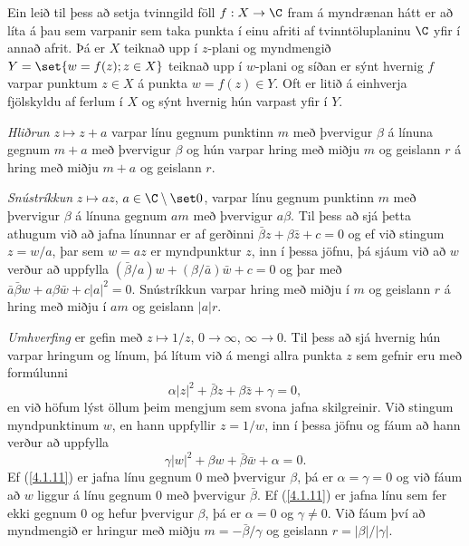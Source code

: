 Ein  leið til þess að setja tvinngild föll
$f:X\to \C$ fram á myndrænan hátt
er að líta á þau sem varpanir sem taka punkta í einu afriti af
tvinntöluplaninu $\C$ yfir í annað afrit.  Þá er $X$ teiknað upp í
$z$-plani og myndmengið $Y=\set{w=f(z); z\in X}$ 
teiknað upp í $w$-plani og síðan er sýnt
hvernig $f$ varpar punktum $z\in X$ á punkta $w=f(z)\in Y$.
Oft er litið á einhverja fjölskyldu af ferlum í $X$ og sýnt hvernig hún
varpast yfir í $Y$. 




\smallskip\noindent
{\it Hliðrun}  $z\mapsto z+a$ varpar línu gegnum punktinn $m$ með
þvervigur ${\beta}$  á línuna gegnum $m+a$ með þvervigur ${\beta}$ og
hún varpar hring með miðju $m$ og geislann $r$ á hring með miðju $m+a$
og geislann $r$.





\smallskip\noindent
{\it Snústríkkun}
$z\mapsto az$, $a\in \C\setminus \set 0$, varpar línu gegnum
punktinn $m$ með þvervigur ${\beta}$  á línuna gegnum $am$ með
þvervigur $a{\beta}$. Til þess að sjá þetta athugum við að jafna
línunnar er af gerðinni $\bar {\beta} z+{\beta}\bar z+c=0$ og ef við
stingum $z=w/a$, þar sem $w=az$ er myndpunktur $z$, inn í þessa
jöfnu, þá sjáum við að $w$ verður að uppfylla
$(\bar {\beta}/a) w+({\beta}/\bar a)\bar w+c=0$ og þar með
$\bar a\bar {\beta} w+a{\beta}\bar w+c|a|^2=0$.  
Snústríkkun varpar hring með miðju í $m$ og geislann $r$ á hring með
miðju í $am$ og geislann $|a|r$.




\smallskip\noindent
{\it Umhverfing} er gefin
með $z\mapsto 1/z$, $0\to {\infty}$, ${\infty}\to 0$.  Til þess að
sjá hvernig hún varpar hringum og línum, þá lítum við á mengi allra
punkta $z$ sem gefnir eru með formúlunni
\begin{equation}
{\alpha}|z|^2+\bar {\beta} z+{\beta}\bar z +{\gamma}=0,
\label{4.1.11}
\end{equation}
en við höfum lýst öllum þeim mengjum sem svona jafna skilgreinir.
Við stingum myndpunktinum  $w$, en hann uppfyllir $z=1/w$, inn 
í þessa jöfnu og fáum að hann verður að uppfylla
\begin{equation}
{\gamma}|w|^2+{\beta}w+\bar {\beta}\bar w +{\alpha}=0.
\label{4.1.12}
\end{equation}
Ef (\ref{4.1.11}) er jafna línu gegnum $0$ með þvervigur ${\beta}$, þá er
${\alpha}={\gamma}=0$ og við fáum að $w$ liggur á línu gegnum $0$ með
þvervigur $\bar {\beta}$.  Ef (\ref{4.1.11}) er jafna línu sem fer ekki gegnum
$0$ og hefur þvervigur ${\beta}$, þá er ${\alpha}=0$ og ${\gamma}\neq
0$.  Við fáum því að myndmengið er hringur með miðju $m=-\bar
{\beta}/{\gamma}$  og geislann $r=|{\beta}|/|{\gamma}|$.




